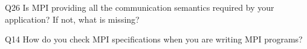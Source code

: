 \begin{description}%
\item{Q26} Is MPI providing all the communication semantics required by your application? If not, what is missing?%
\item{Q14} How do you check MPI specifications when you are writing MPI programs?%
\end{description}%
